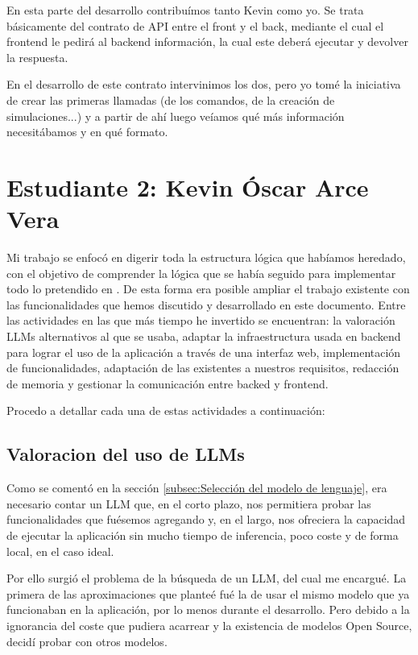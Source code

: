 En esta parte del desarrollo contribuímos tanto Kevin como yo. Se trata básicamente del contrato de API entre el front y el back, mediante el cual el frontend le pedirá al backend información, la cual este deberá ejecutar y devolver la respuesta.

En el desarrollo de este contrato intervinimos los dos, pero yo tomé la iniciativa de crear las primeras llamadas (de los comandos, de la creación de simulaciones...) y a partir de ahí luego veíamos qué más información necesitábamos y en qué formato.

\section*{Estudiante 2: Kevin Óscar Arce Vera}

Mi trabajo se enfocó en digerir toda la estructura lógica que habíamos heredado, con el objetivo de comprender la lógica que se había seguido para implementar todo lo pretendido en \cite{park2023generative}. De esta forma era posible ampliar el trabajo existente con las funcionalidades que hemos discutido y desarrollado en este documento. Entre las actividades en las que más tiempo he invertido se encuentran: la valoración LLMs alternativos al que se usaba,  adaptar la infraestructura usada en backend para lograr el uso de la aplicación a través de una interfaz web, implementación de funcionalidades, adaptación de las existentes a nuestros requisitos, redacción de memoria y gestionar la comunicación entre backed y frontend.

Procedo a detallar cada una de estas actividades a continuación:

\subsection*{Valoracion del uso de LLMs}

Como se comentó en la sección \ref{subsec:Selección del modelo de lenguaje}, era necesario contar un LLM que, en el corto plazo, nos permitiera probar las funcionalidades que fuésemos agregando y, en el largo, nos ofreciera la capacidad de ejecutar la aplicación sin mucho tiempo de inferencia, poco coste y de forma local, en el caso ideal.

Por ello surgió el problema de la búsqueda de un LLM, del cual me encargué. La primera de las aproximaciones que planteé fué la de usar el mismo modelo que ya funcionaban en la aplicación, por lo menos durante el desarrollo. Pero debido a la ignorancia del coste que pudiera acarrear y la existencia de modelos Open Source, decidí probar con otros modelos.

